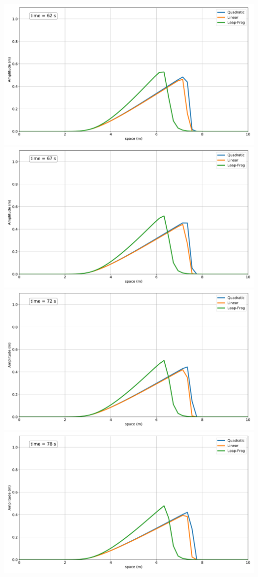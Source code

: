 \includegraphics[width=\linewidth]{../BurgersEquation/images/imp12.pdf}
\includegraphics[width=\linewidth]{../BurgersEquation/images/imp13.pdf}
\includegraphics[width=\linewidth]{../BurgersEquation/images/imp14.pdf}
\includegraphics[width=\linewidth]{../BurgersEquation/images/imp15.pdf}

